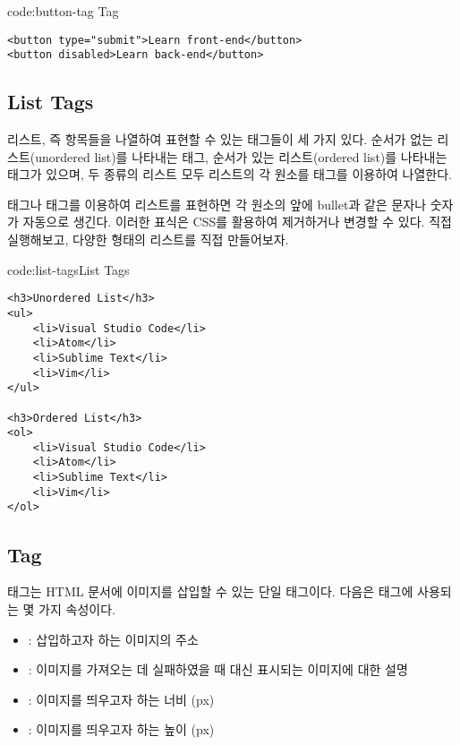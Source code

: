 \begin{codeenv}{code:button-tag}{ Tag}\begin{verbatim}
<button type="submit">Learn front-end</button>
<button disabled>Learn back-end</button>
\end{verbatim}
\end{codeenv}

\subsection*{List Tags}
리스트, 즉 항목들을 나열하여 표현할 수 있는 태그들이 세 가지 있다. 순서가 없는 리스트(unordered list)를 나타내는  태그, 순서가 있는 리스트(ordered list)를 나타내는  태그가 있으며, 두 종류의 리스트 모두 리스트의 각 원소를  태그를 이용하여 나열한다.

 태그나  태그를 이용하여 리스트를 표현하면 각 원소의 앞에 bullet과 같은 문자나 숫자가 자동으로 생긴다. 이러한 표식은 CSS를 활용하여 제거하거나 변경할 수 있다. \를 직접 실행해보고, 다양한 형태의 리스트를 직접 만들어보자.

\begin{codeenv}{code:list-tags}{List Tags}\begin{verbatim}
<h3>Unordered List</h3>
<ul>
    <li>Visual Studio Code</li>
    <li>Atom</li>
    <li>Sublime Text</li>
    <li>Vim</li>
</ul>

<h3>Ordered List</h3>
<ol>
    <li>Visual Studio Code</li>
    <li>Atom</li>
    <li>Sublime Text</li>
    <li>Vim</li>
</ol>
\end{verbatim}
\end{codeenv}

\subsection*{ Tag}
 태그는 HTML 문서에 이미지를 삽입할 수 있는 단일 태그이다. 다음은  태그에 사용되는 몇 가지 속성이다.

\begin{itemize}
    \item {}: 삽입하고자 하는 이미지의 주소
    \item {}: 이미지를 가져오는 데 실패하였을 때 대신 표시되는 이미지에 대한 설명
    \item {}: 이미지를 띄우고자 하는 너비 (px)
    \item {}: 이미지를 띄우고자 하는 높이 (px)
\end{itemize}

